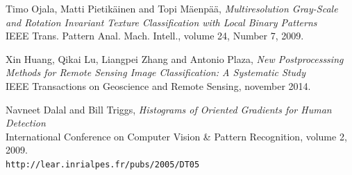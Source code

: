 \documentclass{article}
\begin{document}
\begin{thebibliography}{9}
Timo Ojala, Matti Pietikäinen and Topi Mäenpää,
\textit{Multiresolution Gray-Scale and Rotation Invariant Texture Classification
	with Local Binary Patterns} \\
{IEEE} Trans. Pattern Anal. Mach. Intell., volume 24, Number 7, 2009.

Xin Huang, Qikai Lu, Liangpei Zhang and Antonio Plaza,
\textit{New Postprocesssing Methods for Remote Sensing Image Classification: A Systematic Study} \\
{IEEE} Transactions on Geoscience and Remote Sensing, november 2014.

Navneet Dalal and Bill Triggs,
\textit{Histograms of Oriented Gradients for Human Detection} \\
International Conference on Computer Vision \& Pattern Recognition, volume 2, 2009.
\\\texttt{http://lear.inrialpes.fr/pubs/2005/DT05}
\end{thebibliography}

%
\end{document}
